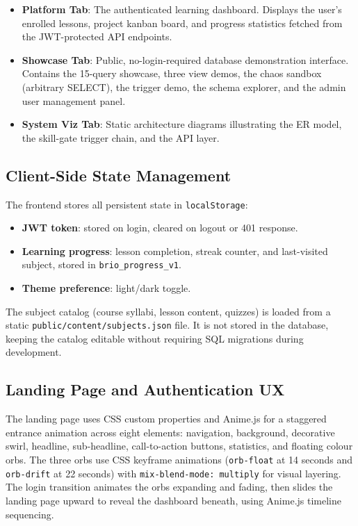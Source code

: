 \documentclass[12pt,a4paper]{article}
\begin{document}
\begin{itemize}[itemsep=4pt]
    \item \textbf{Platform Tab}: The authenticated learning dashboard. Displays the user's
          enrolled lessons, project kanban board, and progress statistics fetched from the
          JWT-protected API endpoints.
    \item \textbf{Showcase Tab}: Public, no-login-required database demonstration interface.
          Contains the 15-query showcase, three view demos, the chaos sandbox (arbitrary SELECT),
          the trigger demo, the schema explorer, and the admin user management panel.
    \item \textbf{System Viz Tab}: Static architecture diagrams illustrating the ER model, the
          skill-gate trigger chain, and the API layer.
\end{itemize}

\subsection{Client-Side State Management}

The frontend stores all persistent state in \texttt{localStorage}:

\begin{itemize}[itemsep=2pt]
    \item \textbf{JWT token}: stored on login, cleared on logout or 401 response.
    \item \textbf{Learning progress}: lesson completion, streak counter, and last-visited
          subject, stored in \texttt{brio\_progress\_v1}.
    \item \textbf{Theme preference}: light/dark toggle.
\end{itemize}

The subject catalog (course syllabi, lesson content, quizzes) is loaded from a static
\texttt{public/content/subjects.json} file. It is not stored in the database, keeping the
catalog editable without requiring SQL migrations during development.

\subsection{Landing Page and Authentication UX}

The landing page uses CSS custom properties and Anime.js for a staggered entrance animation
across eight elements: navigation, background, decorative swirl, headline, sub-headline,
call-to-action buttons, statistics, and floating colour orbs. The three orbs use CSS keyframe
animations (\texttt{orb-float} at 14 seconds and \texttt{orb-drift} at 22 seconds) with
\texttt{mix-blend-mode: multiply} for visual layering. The login transition animates the orbs
expanding and fading, then slides the landing page upward to reveal the dashboard beneath,
using Anime.js timeline sequencing.
\end{document}
